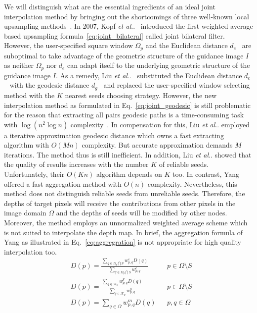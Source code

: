 \documentclass[preprint,10pt,5p,times,twocolumn]{elsarticle}
\makeatletter
\DeclareRobustCommand\onedot{\futurelet\@let@token\@onedot}
\def\@onedot{\ifx\@let@token.\else.\null\fi\xspace}
\def\etal{\emph{et al}\onedot}
\makeatother
\begin{document}
We will distinguish what are the essential ingredients of an ideal joint interpolation method by bringing out the shortcomings of three well-known local upsampling methods~\cite{Kopf2007,Liu2013,Yang2012}. In 2007, Kopf \etal~\cite{Kopf2007} introduced the first weighted average based upsampling formula~\eqref{eq:joint_bilateral} called joint bilateral filter. However, the user-specified square window $\Omega_p$ and the Euclidean distance $d_e$~\cite{Kopf2007} are suboptimal to take advantage of the geometric structure of the guidance image $I$ as neither $\Omega_p$ nor $d_e$ can adapt itself to the underlying geometric structure of the guidance image $I$. As a remedy, Liu \etal~\cite{Liu2013} substituted the Euclidean distance $d_e$~\cite{Kopf2007} with the geodesic distance $d_g$~\cite{Liu2013} and replaced the user-specified window selecting method with the $K$ nearest seeds choosing strategy. However, the new interpolation method as formulated in Eq.~\eqref{eq:joint_geodesic} is still problematic for the reason that extracting all pairs geodesic paths is a time-consuming task with $\log(n^2 \log n)$ complexity~\cite{Kopf2007}. In compensation for this, Liu \etal employed a iterative approximation geodesic distance which owns a fast extracting algorithm with $O(Mn)$ complexity. But accurate approximation demands $M$ iterations. The method thus is still inefficient. In addition, Liu \etal showed that the quality of results increases with the number $K$ of reliable seeds. Unfortunately, their $O(Kn)$ algorithm depends on $K$ too. In contrast, Yang~\cite{Yang2012} offered a fast aggregation method with $O(n)$ complexity. Nevertheless, this method does not distinguish reliable seeds from unreliable seeds. Therefore, the depths of target pixels will receive the contributions from other pixels in the image domain $\Omega$ and the depths of seeds will be modified by other nodes. Moreover, the method employs an unnormalized weighted average scheme which is not suited to interpolate the depth map. In brief, the aggregation formula of Yang as illustrated in Eq.~\eqref{eq:aggregration} is not appropriate for high quality interpolation too.
%
\begin{align}
&D(p) = \frac{ \sum\nolimits_{q \in \Omega_p \bigcap S} {w^e_{p,q}D(q)} }{ {\sum\nolimits_{q \in \Omega_p \bigcap S} {w^e_{p,q}}}} &&p \in \Omega \setminus S \label{eq:joint_bilateral} \\
&D(p) = \frac{ \sum\nolimits_{q \in \mathcal{K}_p} {w^g_{p,q}D(q)} }{ {\sum\nolimits_{q \in \mathcal{K}_p} w^g_{p,q}}}  &&p \in \Omega \setminus S   \label{eq:joint_geodesic} \\
&D(p) = \sum\nolimits_{q \in \Omega} w^m_{p,q} D(q)     &&p,q \in \Omega  \label{eq:aggregration}
\end{align}
\end{document}
